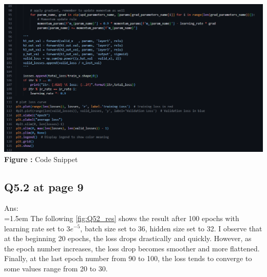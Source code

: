 \documentclass{article}
\begin{document}
	\begin{minipage}{1\linewidth}
		\centering
		\hspace{0.12\linewidth} 
		\includegraphics[width=1\linewidth]{./Q52_cns.png}  %
		\newline
		\textbf{Figure \thefigure:} Code Snippet %
		\label{fig:Q52_cns}  %
	\end{minipage}	
	
	\newpage	
	\subsection*{Q5.2 at page 9\texttt{}}
	Ans:\\
	\hangindent=1.5em \hspace{1.5em}The following \autoref{fig:Q52_res} shows the result after 100 epochs with learning rate set to $3e^{-5}$, batch size set to 36, hidden size set to 32. I observe that at the beginning 20 epochs, the loss drops drastically and quickly. However, as the epoch number increases, the loss drop becomes smoother and more flattened. Finally, at the last epoch number from 90 to 100, the loss tends to converge to some values range from 20 to 30.
	\newline
\end{document}

